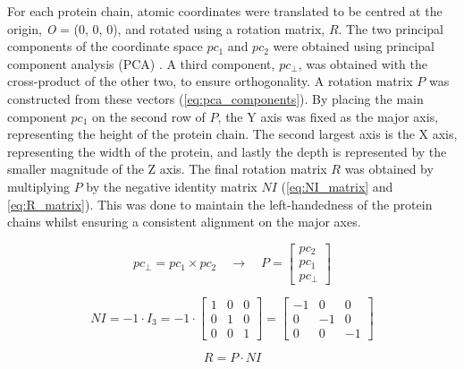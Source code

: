For each protein chain, atomic coordinates were translated to be centred at the origin, \textit{O} = (0, 0, 0), and rotated using a rotation matrix, $R$. The two principal components of the coordinate space $pc_{1}$ and $pc_{2}$ were obtained using principal component analysis (PCA) \cite{HOTELLING_1933_PCA}. A third component, $pc_{\perp}$, was obtained with the cross-product of the other two, to ensure orthogonality. A rotation matrix $P$ was constructed from these vectors (\autoref{eq:pca_components}). By placing the main component $pc_{1}$ on the second row of $P$, the Y axis was fixed as the major axis, representing the height of the protein chain. The second largest axis is the X axis, representing the width of the protein, and lastly the depth is represented by the smaller magnitude of the Z axis. The final rotation matrix $R$ was obtained by multiplying $P$ by the negative identity matrix $NI$ (\autoref{eq:NI_matrix} and \autoref{eq:R_matrix}). This was done to maintain the left-handedness of the protein chains whilst ensuring a consistent alignment on the major axes.

\begin{equation}
pc_{\perp} = pc_{1} \times pc_{2} \quad \rightarrow \quad P = \begin{bmatrix}
pc_{2} \\
pc_{1} \\
pc_{\perp}
\end{bmatrix}
\label{eq:pca_components}
\end{equation}

\begin{equation}
NI = -1 \cdot I_3 = -1 \cdot \begin{bmatrix}
1 & 0 & 0 \\
0 & 1 & 0 \\
0 & 0 & 1 
\end{bmatrix} = \begin{bmatrix}
-1 & 0 & 0 \\
0 & -1 & 0 \\
0 & 0 & -1 
\end{bmatrix}
\label{eq:NI_matrix}
\end{equation}

\begin{equation}
R = P \cdot NI
\label{eq:R_matrix}
\end{equation}

\vspace{-12pt} %
\vspace{-12pt} %
\vspace{-12pt} %

